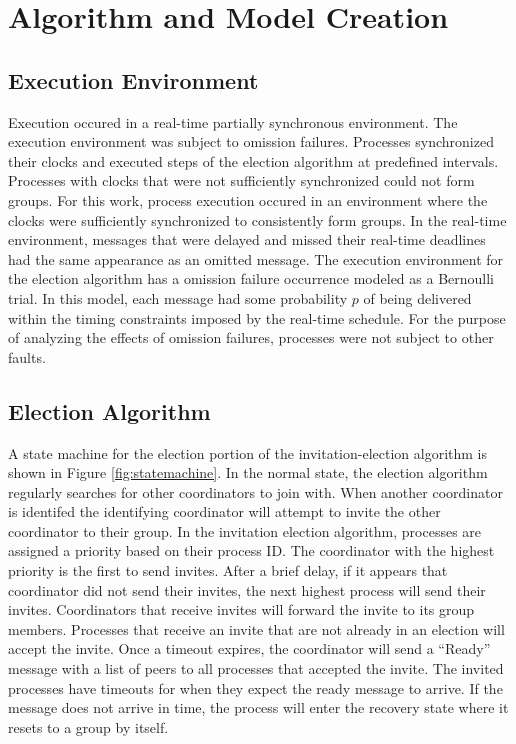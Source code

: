 \chapter{Algorithm and Model Creation}

\section{Execution Environment}

Execution occured in a real-time partially synchronous environment.
The execution environment was subject to omission failures.
Processes synchronized their clocks and executed steps of the election algorithm at predefined intervals.
Processes with clocks that were not sufficiently synchronized could not form groups.
For this work, process execution occured in an environment where the clocks were sufficiently synchronized to consistently form groups.
In the real-time environment, messages that were delayed and missed their real-time deadlines had the same appearance as an omitted message.
The execution environment for the election algorithm has a omission failure occurrence modeled as a Bernoulli trial.
In this model, each message had some probability $p$ of being delivered within the timing constraints imposed by the real-time schedule.
For the purpose of analyzing the effects of omission failures, processes were not subject to other faults.

\section{Election Algorithm}

A state machine for the election portion of the invitation-election algorithm is shown in Figure \ref{fig:statemachine}.
In the normal state, the election algorithm regularly searches for other coordinators to join with.
When another coordinator is identifed the identifying coordinator will attempt to invite the other coordinator to their group.
In the invitation election algorithm, processes are assigned a priority based on their process ID.
The coordinator with the highest priority is the first to send invites.
After a brief delay, if it appears that coordinator did not send their invites, the next highest process will send their invites.
Coordinators that receive invites will forward the invite to its group members.
Processes that receive an invite that are not already in an election will accept the invite.
Once a timeout expires, the coordinator will send a ``Ready'' message with a list of peers to all processes that accepted the invite.
The invited processes have timeouts for when they expect the ready message to arrive.
If the message does not arrive in time, the process will enter the recovery state where it resets to a group by itself.

